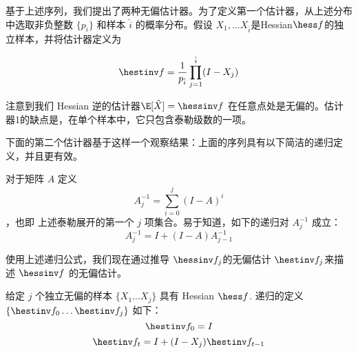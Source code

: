 基于上述序列，我们提出了两种无偏估计器。为了定义第一个估计器，从上述分布中选取非负整数 $\{p_i\}$ 和样本 $\hat{i}$ 的概率分布。假设 $X_1, \ldots X_{\hat{i}}$是Hessian$\hess f$的独立样本，并将估计器定义为
\begin{definition}[
    估计器 1
    ]\label{def:estimator1}
\[\hestinv f = \frac{1}{p_{\hat{i}}}
\prod_{j=1}^{\hat{i}}(I - X_j)\]\end{definition} 
注意到我们 Hessian 逆的估计器$\E [\hat{X}] = \hessinv f$ 在任意点处是无偏的。估计器1的缺点是，在单个样本中，它只包含泰勒级数的一项。

下面的第二个估计器基于这样一个观察结果：上面的序列具有以下简洁的递归定义，并且更有效。

对于矩阵 $A$ 定义  \[A^{-1}_j = \sum_{i=0}^{j} (I - A)^i\]，也即
上述泰勒展开的第一个  $j$ 项集合。易于知道，如下的递归对 $A^{-1}_j$ 成立：
\[A^{-1}_j = I + (I-A)A^{-1}_{j-1}\]

使用上述递归公式，我们现在通过推导 $\hessinv f_j$的无偏估计 $\hestinv f_j$来描述 $\hessinv f$ 的无偏估计。
\begin{definition}[
    估计器 2
    ]
\label{def:estimator2}
给定 $j$ 个独立无偏的样本 $\{X_1 \ldots X_j\}$ 具有 Hessian $\hess f$.
递归的定义 $\{\hestinv f_0 \ldots \hestinv f_j\}$ 如下：
\[ \hestinv f_0 = I\]
\[ \hestinv f_t = I + (I-X_j)\hestinv f_{t-1}\]
\end{definition}

